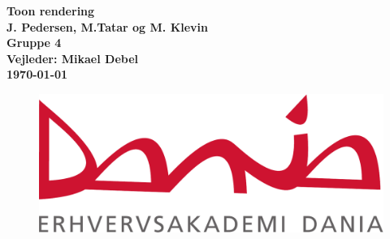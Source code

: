 \begin{titlepage}
   
   \begin{center}
      \Huge\textbf{Toon rendering}
      \\
      \Large\textbf{J. Pedersen, M.Tatar og M. Klevin}
	  \\
      \small\textbf{Gruppe 4}     
      \\
      \small\textbf{Vejleder: Mikael Debel}
      \\
      \small\textbf{\today}
      	\begin{center}
		\begin{figure}
		\includegraphics[width=\linewidth]{Files/Front/dania.pdf}
		\end{figure}
       \end{center}   
   \end{center}
   \thispagestyle{empty}
\end{titlepage}